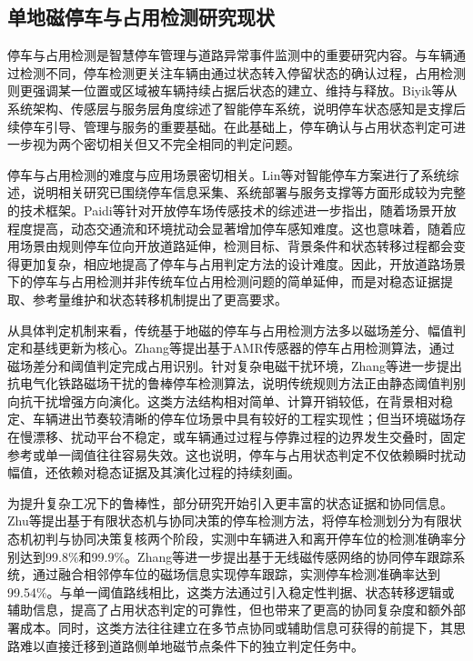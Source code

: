 \documentclass{xdupgthesis}
\begin{document}
\subsection{单地磁停车与占用检测研究现状}
\label{sec:related_parking_detection}

停车与占用检测是智慧停车管理与道路异常事件监测中的重要研究内容。与车辆通过检测不同，停车检测更关注车辆由通过状态转入停留状态的确认过程，占用检测则更强调某一位置或区域被车辆持续占据后状态的建立、维持与释放。Biyik等\cite{ch4_biyik2021smartparking}从系统架构、传感层与服务层角度综述了智能停车系统，说明停车状态感知是支撑后续停车引导、管理与服务的重要基础。在此基础上，停车确认与占用状态判定可进一步视为两个密切相关但又不完全相同的判定问题。

停车与占用检测的难度与应用场景密切相关。Lin等\cite{ch4_lin2017surveyparking}对智能停车方案进行了系统综述，说明相关研究已围绕停车信息采集、系统部署与服务支撑等方面形成较为完整的技术框架。Paidi等\cite{R52}针对开放停车场传感技术的综述进一步指出，随着场景开放程度提高，动态交通流和环境扰动会显著增加停车感知难度。这也意味着，随着应用场景由规则停车位向开放道路延伸，检测目标、背景条件和状态转移过程都会变得更加复杂，相应地提高了停车与占用判定方法的设计难度。因此，开放道路场景下的停车与占用检测并非传统车位占用检测问题的简单延伸，而是对稳态证据提取、参考量维护和状态转移机制提出了更高要求。

从具体判定机制来看，传统基于地磁的停车与占用检测方法多以磁场差分、幅值判定和基线更新为核心。Zhang等\cite{ch4_zhang2015amr}提出基于AMR传感器的停车占用检测算法，通过磁场差分和阈值判定完成占用识别。针对复杂电磁干扰环境，Zhang等\cite{ch4_zhang2020railway}进一步提出抗电气化铁路磁场干扰的鲁棒停车检测算法，说明传统规则方法正由静态阈值判别向抗干扰增强方向演化。这类方法结构相对简单、计算开销较低，在背景相对稳定、车辆进出节奏较清晰的停车位场景中具有较好的工程实现性；但当环境磁场存在慢漂移、扰动平台不稳定，或车辆通过过程与停靠过程的边界发生交叠时，固定参考或单一阈值往往容易失效。这也说明，停车与占用状态判定不仅依赖瞬时扰动幅值，还依赖对稳态证据及其演化过程的持续刻画。

为提升复杂工况下的鲁棒性，部分研究开始引入更丰富的状态证据和协同信息。Zhu等\cite{zhu2018parkingfsm}提出基于有限状态机与协同决策的停车检测方法，将停车检测划分为有限状态机初判与协同决策复核两个阶段，实测中车辆进入和离开停车位的检测准确率分别达到99.8\%和99.9\%。Zhang等\cite{ch4_zhang2020tracking}进一步提出基于无线磁传感网络的协同停车跟踪系统，通过融合相邻停车位的磁场信息实现停车跟踪，实测停车检测准确率达到99.54\%。与单一阈值路线相比，这类方法通过引入稳定性判据、状态转移逻辑或辅助信息，提高了占用状态判定的可靠性，但也带来了更高的协同复杂度和额外部署成本。同时，这类方法往往建立在多节点协同或辅助信息可获得的前提下，其思路难以直接迁移到道路侧单地磁节点条件下的独立判定任务中。
\end{document}
